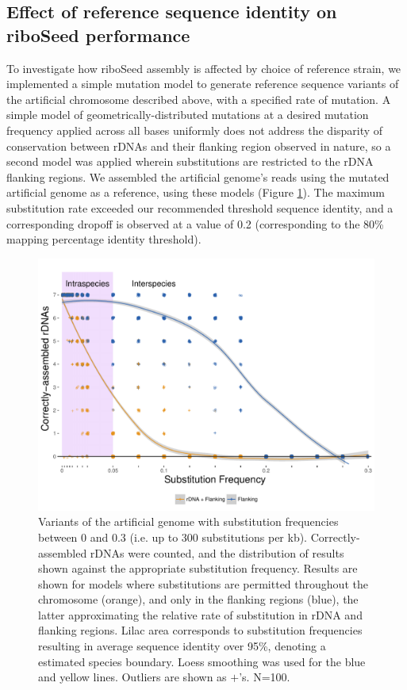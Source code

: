 \documentclass[a4,center,fleqn]{NAR}
\begin{document}
\subsection*{Effect of reference sequence identity on riboSeed performance}
To investigate how riboSeed assembly is affected by choice of reference strain, we implemented a simple mutation model to generate reference sequence variants of the artificial chromosome described above, with a specified rate of mutation. A simple model of geometrically-distributed mutations at a desired mutation frequency applied across all bases uniformly does not address the disparity of conservation between rDNAs and their flanking region observed in nature, so a second model was applied wherein substitutions are restricted to the rDNA flanking regions. We assembled the artificial genome's reads using the mutated artificial genome as a reference, using these models (Figure \ref{fig:degen}). The maximum substitution rate exceeded our recommended threshold sequence identity, and a corresponding dropoff is observed at a value of 0.2 (corresponding to the 80\% mapping percentage identity threshold).

\begin{figure}[!b]
  \centering
    \includegraphics[width=.9\columnwidth]{degenerate_lineplot}
  \caption{Variants of the artificial genome with substitution frequencies between 0 and 0.3 (i.e. up to 300 substitutions per kb). Correctly-assembled rDNAs were counted, and the distribution of results shown against the appropriate substitution frequency. Results are shown for models where substitutions are permitted throughout the chromosome (orange), and only in the flanking regions (blue), the latter approximating the relative rate of substitution in rDNA and flanking regions. Lilac area corresponds to substitution frequencies resulting in average sequence identity over 95\%, denoting a estimated species boundary. Loess smoothing was used for the blue and yellow lines. Outliers are shown as $+$'s. N=100.}
  \label{fig:degen}
\end{figure}
\end{document}
